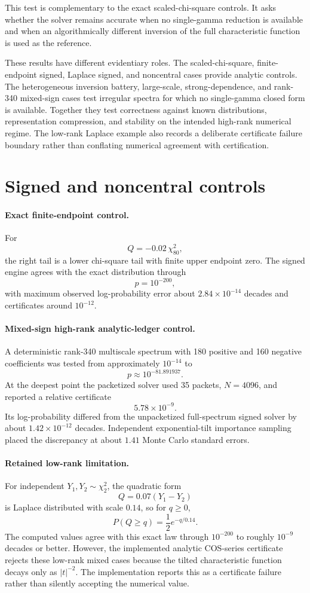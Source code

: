This test is complementary to the exact scaled-chi-square controls.  It asks
whether the solver remains accurate when no single-gamma reduction is
available and when an algorithmically different inversion of the full
characteristic function is used as the reference.

These results have different evidentiary roles.  The scaled-chi-square,
finite-endpoint signed, Laplace signed, and noncentral cases provide analytic
controls.  The heterogeneous inversion battery, large-scale, strong-dependence, and
rank-340 mixed-sign cases test irregular spectra for which no single-gamma
closed form is available.  Together they test correctness against known distributions,
representation compression, and stability on the intended high-rank numerical
regime.  The low-rank Laplace example also records a deliberate certificate
failure boundary rather than conflating numerical agreement with certification.


\section{Signed and noncentral controls}
\paragraph{Exact finite-endpoint control.}
For
\[
Q=-0.02\,\chi^2_{80},
\]
the right tail is a lower chi-square tail with finite upper endpoint zero.  The
signed engine agrees with the exact distribution through
\[
\boxed{p=10^{-200}},
\]
with maximum observed log-probability error about $2.84\times10^{-14}$ decades
and certificates around $10^{-12}$.

\paragraph{Mixed-sign high-rank analytic-ledger control.}
A deterministic rank-340 multiscale spectrum with 180 positive and 160
negative coefficients was tested from approximately $10^{-14}$ to
\[
\boxed{p\approx10^{-81.891937}}.
\]
At the deepest point the packetized solver used 35 packets, $N=4096$, and
reported a relative certificate
\[
5.78\times10^{-9}.
\]
Its log-probability differed from the unpacketized full-spectrum signed solver
by about $1.42\times10^{-12}$ decades.  Independent exponential-tilt
importance sampling placed the discrepancy at about $1.41$ Monte Carlo
standard errors.

\paragraph{Retained low-rank limitation.}
For independent $Y_1,Y_2\sim\chi^2_2$, the quadratic form
\[
Q=0.07(Y_1-Y_2)
\]
is Laplace distributed with scale $0.14$, so for $q\ge0$,
\[
P(Q\ge q)=\frac12e^{-q/0.14}.
\]
The computed values agree with this exact law through $10^{-200}$ to roughly
$10^{-9}$ decades or better.  However, the implemented analytic COS-series
certificate rejects these low-rank mixed cases because the tilted
characteristic function decays only as $|t|^{-2}$.  The implementation reports
this as a certificate failure rather than silently accepting the numerical
value.

